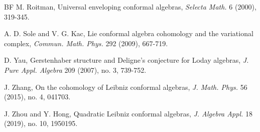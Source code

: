 \documentclass[a4paper,reqno,10pt]{amsart}
\theoremstyle{plain}
\theoremstyle{definition}
\theoremstyle{remark}
\begin{document}
\begin{thebibliography}{BF}
 M. Roitman, Universal enveloping conformal algebras, {\em Selecta Math.} 6 (2000), 319-345.

 A. D. Sole and V. G. Kac, Lie conformal algebra cohomology and the variational complex, {\em Commun. Math. Phys.} 292 (2009), 667-719.


 D. Yau, Gerstenhaber structure and Deligne's conjecture for Loday algebras, {\em J. Pure Appl. Algebra} 209 (2007), no. 3, 739-752.


 J. Zhang, On the cohomology of Leibniz conformal algebras, {\em J. Math. Phys.} 56 (2015), no. 4, 041703.

 J. Zhou and Y. Hong, Quadratic Leibniz conformal algebras, {\em J. Algebra Appl.} 18 (2019), no. 10, 1950195.

\end{thebibliography}
\end{document}
